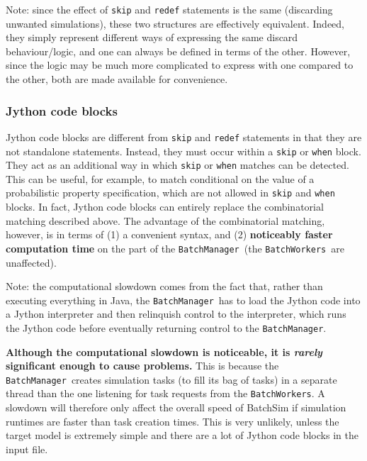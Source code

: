 \documentclass{article}
\newcommand{\BM}{{\tt BatchManager}}
\newcommand{\BWs}{{\tt BatchWorkers}}
\begin{document}
\begin{sideblock}
Note: since the effect of {\tt skip} and {\tt redef} statements is the same (discarding unwanted simulations), these two structures are effectively equivalent. Indeed, they simply represent different ways of expressing the same discard behaviour/logic, and one can always be defined in terms of the other. However, since the logic may be much more complicated to express with one compared to the other, both are made available for convenience.
\end{sideblock}

\subsubsection{Jython code blocks}

Jython code blocks are different from {\tt skip} and {\tt redef} statements in that they are not standalone statements. Instead, they must occur within a {\tt skip} or {\tt when} block. They act as an additional way in which {\tt skip} or {\tt when} matches can be detected. This can be useful, for example, to match conditional on the value of a probabilistic property specification, which are not allowed in {\tt skip} and {\tt when} blocks. In fact, Jython code blocks can entirely replace the combinatorial matching described above. The advantage of the combinatorial matching, however, is in terms of (1) a convenient syntax, and (2) \textbf{noticeably faster computation time} on the part of the \BM\ (the \BWs\ are unaffected).

\begin{sideblock}
Note: the computational slowdown comes from the fact that, rather than executing everything in Java, the \BM\ has to load the Jython code into a Jython interpreter and then relinquish control to the interpreter, which runs the Jython code before eventually returning control to the \BM.

\textbf{Although the computational slowdown is noticeable, it is \textit{rarely} significant enough to cause problems.} This is because the \BM\ creates simulation tasks (to fill its bag of tasks) in a separate thread than the one listening for task requests from the \BWs. A slowdown will therefore only affect the overall speed of BatchSim if simulation runtimes are faster than task creation times. This is very unlikely, unless the target model is extremely simple and there are a lot of Jython code blocks in the input file.
\end{sideblock}
\end{document}

